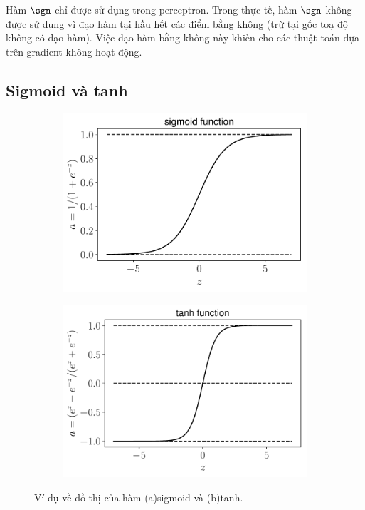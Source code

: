 Hàm $\sgn$ chỉ được sử dụng trong perceptron. Trong thực tế, hàm
$\sgn$ không được sử dụng vì đạo hàm tại hầu hết các điểm bằng không (trừ
tại gốc toạ độ không có đạo hàm). Việc đạo hàm bằng không này khiến cho các thuật toán dựa trên gradient không hoạt động.
 
\subsection{Sigmoid và tanh}
\begin{figure}[t]
    \begin{subfigure}{0.49\textwidth}
    \includegraphics[width=0.99\linewidth]{ebookML_src/src/mlp/sigmoid.pdf}
    \caption{}
    \label{fig:14_5a}
    \end{subfigure}
    \begin{subfigure}{0.49\textwidth}
    \includegraphics[width=0.99\linewidth]{ebookML_src/src/mlp/tanh.pdf}
    \caption{}
    \label{fig:14_5b}
    \end{subfigure}
    \caption{
     Ví dụ về đồ thị của hàm (a){sigmoid} và (b){tanh}.
    }
    \label{fig:14_5}
\end{figure}
